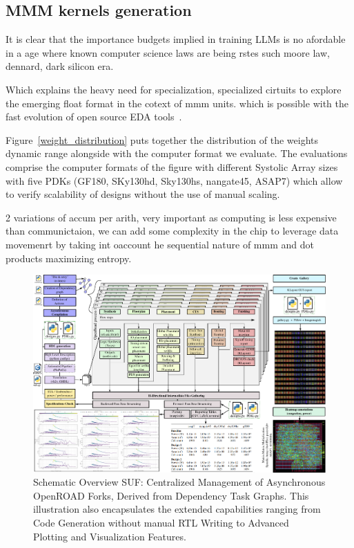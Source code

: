 \subsection{MMM kernels generation}
\label{sec:contributions}
It is clear that the importance budgets implied in training LLMs is no afordable in a age where known computer science laws are being rstes such moore law, dennard, dark silicon era.

Which explains the heavy need for specialization, specialized cirtuits to explore the emerging float format in the cotext of mmm units. which is possible with the fast evolution of open source EDA tools~\cite{OpenROAD,us_osda}.

Figure~\ref{weight_distribution} puts together the distribution of the weights dynamic range alongside with the computer format we evaluate.
The evaluations comprise the computer formats of the figure with different Systolic Array sizes with five PDKs (GF180, SKy130hd, Sky130hs, nangate45, ASAP7) which allow to verify scalability of designs without the use of manual scaling.

2 variations of accum per arith, very important as computing is less expensive than communictaion, we can add some complexity in the chip to leverage data movemenrt by taking int oaccount he sequential nature of mmm and dot products maximizing entropy.

\begin{figure}[b]
\centering
	\vspace{-0.5cm}
	\includegraphics[width=\columnwidth]{./figures/SUF.pdf}
	\vspace{-0.5cm}
	\caption{Schematic Overview SUF: Centralized Management of Asynchronous OpenROAD Forks, Derived from Dependency Task Graphs. This illustration also encapsulates the extended capabilities ranging from Code Generation without manual RTL Writing to Advanced Plotting and Visualization Features.}
	\label{fig:suf}
\end{figure}

